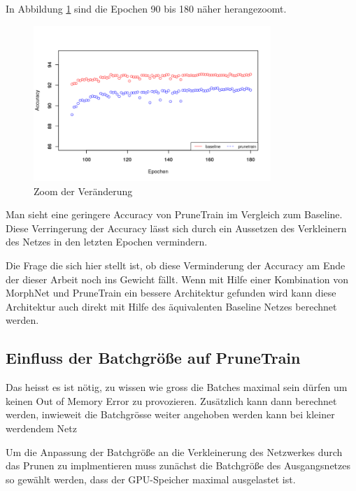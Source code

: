 In Abbildung \ref{abb:PTaccuracyzoom} sind die Epochen 90 bis 180 näher herangezoomt.

\begin{figure}[h]
 \centering
 \includegraphics[width=0.8\textwidth]{KapitelPartB/Images/PTaccuracyzoom.png}
 \caption{Zoom der Veränderung}
 \label{abb:PTaccuracyzoom}
\end{figure}

Man sieht eine geringere Accuracy von PruneTrain im Vergleich zum Baseline. Diese Verringerung der Accuracy lässt sich durch ein Aussetzen des Verkleinern des Netzes in den letzten Epochen  
vermindern.

Die Frage die sich hier stellt ist, ob diese Verminderung der Accuracy am Ende der dieser Arbeit noch ins Gewicht fällt. Wenn mit Hilfe einer Kombination von MorphNet und PruneTrain ein bessere Architektur gefunden wird kann diese Architektur auch direkt mit Hilfe des äquivalenten Baseline Netzes berechnet werden.

\subsection{Einfluss der Batchgröße auf PruneTrain}\label{sec:batch}

Das heisst es ist nötig, zu wissen wie gross die Batches maximal sein dürfen um keinen Out of Memory Error zu provozieren. Zusätzlich kann dann berechnet werden, inwieweit die Batchgrösse weiter angehoben werden kann bei kleiner werdendem Netz

Um die Anpassung der Batchgröße an die Verkleinerung des Netzwerkes durch das Prunen zu implmentieren muss zunächst die Batchgröße des Ausgangsnetzes so gewählt werden, dass der GPU-Speicher maximal ausgelastet ist.



